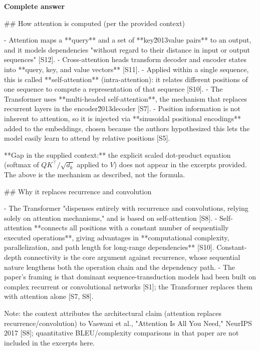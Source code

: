 \documentclass[10pt]{article}
\begin{document}
\textbf{Complete answer}
\begin{AnswerText}
## How attention is computed (per the provided context)

- Attention maps a **query** and a set of **key\u2013value pairs** to an output, and it models dependencies "without regard to their distance in input or output sequences" [S12].
- Cross-attention heads transform decoder and encoder states into **query, key, and value vectors** [S11].
- Applied within a single sequence, this is called **self-attention** (intra-attention): it relates different positions of one sequence to compute a representation of that sequence [S10].
- The Transformer uses **multi-headed self-attention**, the mechanism that replaces recurrent layers in the encoder\u2013decoder [S7].
- Position information is not inherent to attention, so it is injected via **sinusoidal positional encodings** added to the embeddings, chosen because the authors hypothesized this lets the model easily learn to attend by relative positions [S5].

**Gap in the supplied context:** the explicit scaled dot-product equation (softmax of $QK^{\top}/\sqrt{d_k}$ applied to $V$) does not appear in the excerpts provided. The above is the mechanism as described, not the formula.

## Why it replaces recurrence and convolution

- The Transformer "dispenses entirely with recurrence and convolutions, relying solely on attention mechanisms," and is based on self-attention [S8].
- Self-attention **connects all positions with a constant number of sequentially executed operations**, giving advantages in **computational complexity, parallelization, and path length for long-range dependencies** [S10]. Constant-depth connectivity is the core argument against recurrence, whose sequential nature lengthens both the operation chain and the dependency path.
- The paper's framing is that dominant sequence-transduction models had been built on complex recurrent or convolutional networks [S1]; the Transformer replaces them with attention alone [S7, S8].

Note: the context attributes the architectural claim (attention replaces recurrence/convolution) to Vaswani et al., "Attention Is All You Need," NeurIPS 2017 [S8]; quantitative BLEU/complexity comparisons in that paper are not included in the excerpts here.
\end{AnswerText}
\end{document}
